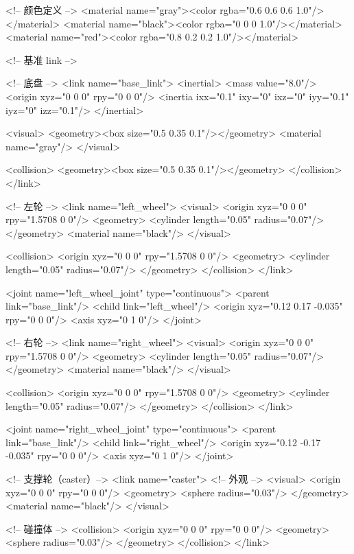 \documentclass[a4paper,12pt]{book}
\begin{document}
{  <!-- 颜色定义 -->
  <material name="gray"><color rgba="0.6 0.6 0.6 1.0"/></material>
  <material name="black"><color rgba="0 0 0 1.0"/></material>
  <material name="red"><color rgba="0.8 0.2 0.2 1.0"/></material>

  <!-- 基准 link -->

  <!-- 底盘 -->
  <link name="base\_link">
    <inertial>
      <mass value="8.0"/>
      <origin xyz="0 0 0" rpy="0 0 0"/>
      <inertia ixx="0.1" ixy="0" ixz="0" iyy="0.1" iyz="0" izz="0.1"/>
    </inertial>

    <visual>
      <geometry><box size="0.5 0.35 0.1"/></geometry>
      <material name="gray"/>
    </visual>

    <collision>
      <geometry><box size="0.5 0.35 0.1"/></geometry>
    </collision>
  </link>

  <!-- 左轮 -->
  <link name="left\_wheel">
    <visual>
      <origin xyz="0 0 0" rpy="1.5708 0 0"/>
      <geometry>
        <cylinder length="0.05" radius="0.07"/>
      </geometry>
      <material name="black"/>
    </visual>

    <collision>
      <origin xyz="0 0 0" rpy="1.5708 0 0"/>
      <geometry>
        <cylinder length="0.05" radius="0.07"/>
      </geometry>
    </collision>
  </link>

  <joint name="left\_wheel\_joint" type="continuous">
    <parent link="base\_link"/>
    <child link="left\_wheel"/>
    <origin xyz="0.12 0.17 -0.035" rpy="0 0 0"/>
    <axis xyz="0 1 0"/>
  </joint>

  <!-- 右轮 -->
  <link name="right\_wheel">
    <visual>
      <origin xyz="0 0 0" rpy="1.5708 0 0"/>
      <geometry>
        <cylinder length="0.05" radius="0.07"/>
      </geometry>
      <material name="black"/>
    </visual>

    <collision>
      <origin xyz="0 0 0" rpy="1.5708 0 0"/>
      <geometry>
        <cylinder length="0.05" radius="0.07"/>
      </geometry>
    </collision>
  </link>

  <joint name="right\_wheel\_joint" type="continuous">
    <parent link="base\_link"/>
    <child link="right\_wheel"/>
    <origin xyz="0.12 -0.17 -0.035" rpy="0 0 0"/>
    <axis xyz="0 1 0"/>
  </joint>

<!-- 支撑轮（caster）-->
  <link name="caster">
    <!-- 外观 -->
    <visual>
      <origin xyz="0 0 0" rpy="0 0 0"/>
      <geometry>
        <sphere radius="0.03"/>
      </geometry>
      <material name="black"/>
    </visual>

    <!-- 碰撞体 -->
    <collision>
      <origin xyz="0 0 0" rpy="0 0 0"/>
      <geometry>
        <sphere radius="0.03"/>
      </geometry>
    </collision>
  </link>

}
\end{document}
